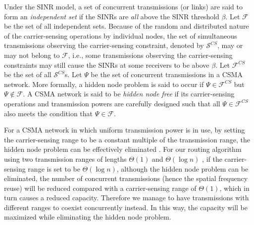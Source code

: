 \documentclass[english]{IEEEtran}
\theoremstyle{plain}
\theoremstyle{plain}
\theoremstyle{plain}
\theoremstyle{remark}
\begin{document}
Under the SINR model, a set of concurrent transmissions (or links)
are said to form an \emph{independent set} if the SINRs are \emph{all}
above the SINR threshold $\beta$. Let $\mathcal{F}$ be the set of
all independent sets. Because of the random and distributed nature
of the carrier-sensing operations by individual nodes, the set of
simultaneous transmissions observing the carrier-sensing constraint,
denoted by $\mathcal{S}^{CS}$, may or may not belong to $\mathcal{F}$,
i.e., some transmissions observing the carrier-sensing constraints
may still cause the SINRs at some receivers to be above $\beta$.
Let $\mathcal{F}^{CS}$ be the set of all $\mathcal{S}^{CS}$s. Let
$\Psi$ be the set of concurrent transmissions in a CSMA network.
More formally, a hidden node problem is said to occur if $\Psi\in\mathcal{F}^{CS}$
but $\Psi\notin\mathcal{F}$. A\emph{ }CSMA network is said to be
\emph{hidden node free} if its carrier-sensing operations and transmission
powers are carefully designed such that all $\Psi\in\mathcal{F}^{CS}$
also meets the condition that $\Psi\in\mathcal{F}$.

For a CSMA network in which uniform transmission power is in use,
by setting the carrier-sensing range to be a constant multiple of
the transmission range, the hidden node problem can be effectively
eliminated \cite{Fu12Effective,Chau11Capacity}. For our routing algorithm
using two transmission ranges of lengths $\Theta\left(1\right)$ and
$\Theta\left(\log n\right)$ , if the carrier-sensing range is set
to be $\Theta\left(\log n\right)$, although the hidden node problem
can be eliminated, the number of concurrent transmissions (hence the
spatial frequency reuse) will be reduced compared with a carrier-sensing
range of $\Theta\left(1\right)$, which in turn causes a reduced capacity.
Therefore we manage to have transmissions with different ranges to
coexist concurrently instead. In this way, the capacity will be maximized
while eliminating the hidden node problem. 
\end{document}
